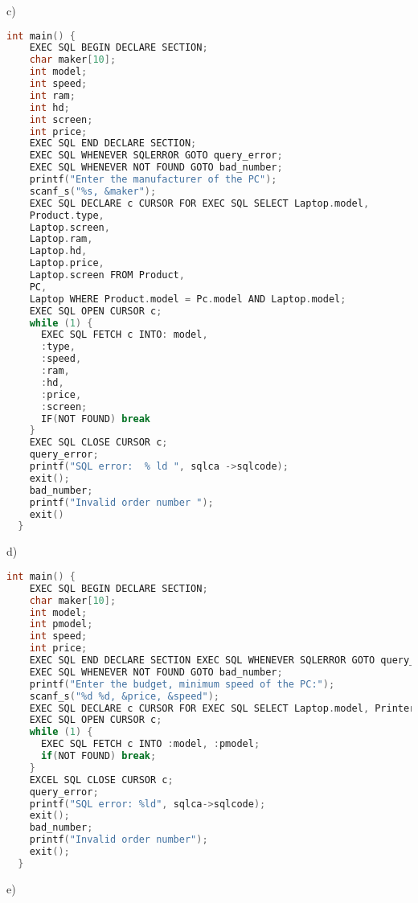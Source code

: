 \documentclass[../../main.tex]{subfiles}
\begin{document}
c)

\begin{lstlisting}[language=c]
  int main() {
    EXEC SQL BEGIN DECLARE SECTION;
    char maker[10];
    int model;
    int speed;
    int ram;
    int hd;
    int screen;
    int price;
    EXEC SQL END DECLARE SECTION;
    EXEC SQL WHENEVER SQLERROR GOTO query_error;
    EXEC SQL WHENEVER NOT FOUND GOTO bad_number;
    printf("Enter the manufacturer of the PC");
    scanf_s("%s, &maker");
    EXEC SQL DECLARE c CURSOR FOR EXEC SQL SELECT Laptop.model,
    Product.type,
    Laptop.screen,
    Laptop.ram,
    Laptop.hd,
    Laptop.price,
    Laptop.screen FROM Product,
    PC,
    Laptop WHERE Product.model = Pc.model AND Laptop.model;
    EXEC SQL OPEN CURSOR c;
    while (1) {
      EXEC SQL FETCH c INTO: model,
      :type,
      :speed,
      :ram,
      :hd,
      :price,
      :screen;
      IF(NOT FOUND) break
    }
    EXEC SQL CLOSE CURSOR c;
    query_error;
    printf("SQL error:  % ld ", sqlca ->sqlcode);
    exit();
    bad_number;
    printf("Invalid order number ");
    exit()
  }
\end{lstlisting}

d)

\begin{lstlisting}[language=c]
  int main() {
    EXEC SQL BEGIN DECLARE SECTION;
    char maker[10];
    int model;
    int pmodel;
    int speed;
    int price;
    EXEC SQL END DECLARE SECTION EXEC SQL WHENEVER SQLERROR GOTO query_error;
    EXEC SQL WHENEVER NOT FOUND GOTO bad_number;
    printf("Enter the budget, minimum speed of the PC:");
    scanf_s("%d %d, &price, &speed");
    EXEC SQL DECLARE c CURSOR FOR EXEC SQL SELECT Laptop.model, Printer.model FROM Product, Laptop, Printer, PC WHERE PC.model <=<=price;
    EXEC SQL OPEN CURSOR c;
    while (1) {
      EXEC SQL FETCH c INTO :model, :pmodel;
      if(NOT FOUND) break;
    }
    EXCEL SQL CLOSE CURSOR c;
    query_error;
    printf("SQL error: %ld", sqlca->sqlcode);
    exit();
    bad_number;
    printf("Invalid order number");
    exit();
  }
\end{lstlisting}

e)
\end{document}

